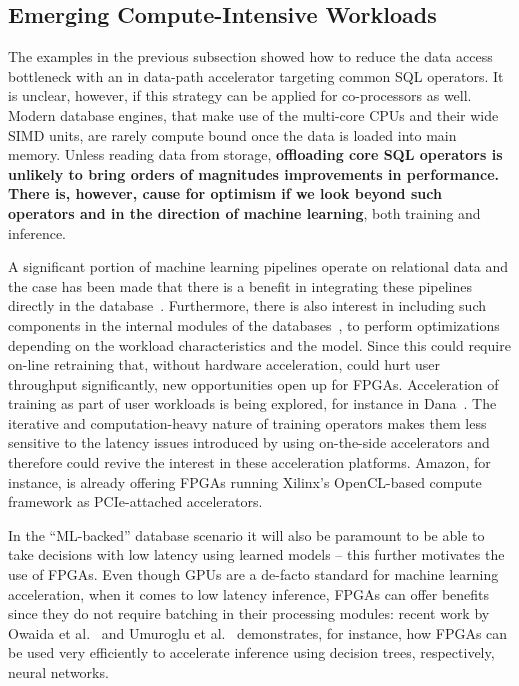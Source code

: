 \documentclass[11pt]{article}
\begin{document}
\subsection{Emerging Compute-Intensive Workloads}


The examples in the previous subsection showed how to reduce the data access bottleneck with an in data-path accelerator targeting common SQL operators. It is unclear, however, if this strategy can be applied for co-processors as well.
Modern database engines, that make use of the multi-core CPUs and their wide SIMD units, are rarely compute bound once the data is loaded into main memory. Unless reading data from storage, \textbf{offloading core SQL operators is unlikely to bring orders of magnitudes improvements in performance. There is, however, cause for optimism if we look beyond such operators and in the direction of machine learning}, both training and inference.

A significant portion of machine learning pipelines operate on relational data and the case has been made that there is a benefit in integrating these pipelines directly in the database~\cite{mahajan-danafpga-vldb18}. Furthermore, there is also interest in including such components in the internal modules of the databases~\cite{kraska-sage-cidr19}, to perform optimizations depending on the workload characteristics and the model. Since this could require on-line retraining that, without hardware acceleration, could hurt user throughput significantly, new opportunities open up for FPGAs. Acceleration of training as part of user workloads is being explored, for instance in Dana~\cite{mahajan-danafpga-vldb18}. The iterative and computation-heavy nature of training operators makes them less sensitive to the latency issues introduced by using on-the-side accelerators and therefore could revive the interest in these acceleration platforms. Amazon, for instance, is already offering FPGAs running Xilinx's OpenCL-based compute framework as PCIe-attached accelerators. 

In the ``ML-backed'' database scenario it will also be paramount to be able to take decisions with low latency using learned models -- this further motivates the use of FPGAs. Even though GPUs are a de-facto standard for machine learning acceleration, when it comes to low latency inference, FPGAs can offer benefits since they do not require batching in their processing modules: recent work by Owaida et al.~\cite{owaida-trees-fpl17} and Umuroglu et al.~\cite{umuroglu-finn-fpga17} demonstrates, for instance, how FPGAs can be used very efficiently to accelerate inference using decision trees, respectively, neural networks. 
\end{document}
